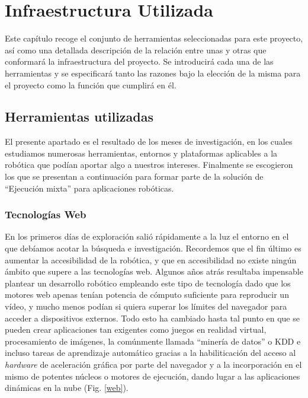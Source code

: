 \chapter{Infraestructura Utilizada}

Este capítulo recoge el conjunto de herramientas seleccionadas para este proyecto, así como una detallada descripción de la relación entre unas y otras que conformará la infraestructura del proyecto.
Se introducirá cada una de las herramientas y se especificará tanto las razones bajo la elección de la misma para el proyecto como la función que cumplirá en él.

\section{Herramientas utilizadas}

El presente apartado es el resultado de los meses de investigación, en los cuales estudiamos numerosas herramientas, entornos y plataformas aplicables a la robótica que podían aportar algo a nuestros intereses. Finalmente se escogieron los que se presentan a continuación para formar parte de la solución de ``Ejecución mixta'' para aplicaciones robóticas.

\subsection{Tecnologías Web}

En los primeros días de exploración salió rápidamente a la luz el entorno en el que debíamos acotar la búsqueda e investigación. Recordemos que el fin último es aumentar la accesibilidad de la robótica, y que en accesibilidad no existe ningún ámbito que supere a las tecnologías web. Algunos años atrás resultaba impensable plantear un desarrollo robótico empleando este tipo de tecnología dado que los motores web apenas tenían potencia de cómputo suficiente para reproducir un vídeo, y mucho menos podían si quiera superar los límites del navegador para acceder a dispositivos externos. Todo esto ha cambiado hasta tal punto en que se pueden crear aplicaciones tan exigentes como juegos en realidad virtual, procesamiento de imágenes, la comúnmente llamada ``minería de datos'' o KDD e incluso tareas de aprendizaje automático gracias a la habiliticación del acceso al \textit{hardware} de aceleración gráfica por parte del navegador y a la incorporación en el mismo de potentes núcleos o motores de ejecución, dando lugar a las aplicaciones dinámicas en la nube (Fig. \ref{web}).

